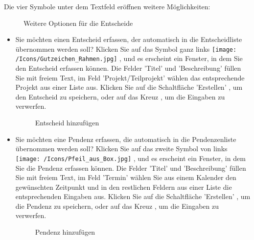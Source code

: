 \vspace{\baselineskip}

Die vier Symbole unter dem Textfeld eröffnen weitere Möglichkeiten:

\begin{figure}[H]
\caption{Weitere Optionen für die Entscheide}
\end{figure}

\begin{itemize}
\item
Sie möchten einen Entscheid erfassen, der automatisch in die Entscheidliste übernommen werden soll? Klicken Sie auf das Symbol ganz links \texttt{[image: /Icons/Gutzeichen\_Rahmen.jpg]} , und es erscheint ein Fenster, in dem Sie den Entscheid erfassen können. Die Felder 'Titel'  und 'Beschreibung'  füllen Sie mit freiem Text, im Feld 'Projekt/Teilprojekt'  wählen das entsprechende Projekt aus einer Liste aus. Klicken Sie auf die Schaltfläche 'Erstellen' , um den Entscheid zu speichern, oder auf das Kreuz , um die Eingaben zu verwerfen.

\begin{figure}[H]
\caption{Entscheid hinzufügen}
\end{figure}

\end{itemize}

\begin{itemize}
\item
Sie möchten eine Pendenz erfassen, die automatisch in die Pendenzenliste übernommen werden soll? Klicken Sie auf das zweite Symbol von links \texttt{[image: /Icons/Pfeil\_aus\_Box.jpg]} , und es erscheint ein Fenster, in dem Sie die Pendenz erfassen können. Die Felder 'Titel'  und 'Beschreibung'  füllen Sie mit freiem Text, im Feld 'Termin'  wählen Sie aus einem Kalender den gewünschten Zeitpunkt und in den restlichen Feldern  aus einer Liste die entsprechenden Eingaben aus. Klicken Sie auf die Schaltfläche 'Erstellen' , um die Pendenz zu speichern, oder auf das Kreuz , um die Eingaben zu verwerfen.

\begin{figure}[H]
\caption{Pendenz hinzufügen}
\end{figure}

\end{itemize}

